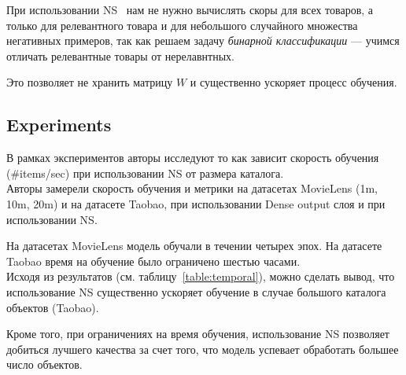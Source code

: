 При использовании NS~\cite{mikolov2013distributed} нам не нужно вычислять скоры для всех товаров, а только для релевантного товара и для небольшого случайного множества негативных примеров, так как решаем задачу \textit{бинарной классификации} --- учимся отличать релевантные товары от нерелавнтных.

Это позволяет не хранить матрицу $W$ и существенно ускоряет процесс обучения.

\subsection*{Experiments}

В рамках экспериментов авторы исследуют то как зависит скорость обучения (\#items/sec) при использовании NS от размера каталога. \\

Авторы замерели скорость обучения и метрики на датасетах MovieLens (1m, 10m, 20m) и на датасете Taobao, при использовании Dense output слоя и при использовании NS.

На датасетах MovieLens модель обучали в течении четырех эпох. На датасете Taobao время на обучение было ограничено шестью часами. \\

Исходя из результатов (см. таблицу~\ref{table:temporal}), можно сделать вывод, что использование NS существенно ускоряет обучение в случае большого каталога объектов (Taobao).

Кроме того, при ограничениях на время обучения, использование NS позволяет добиться лучшего качества за счет того, что модель успевает обработать большее число объектов. 

